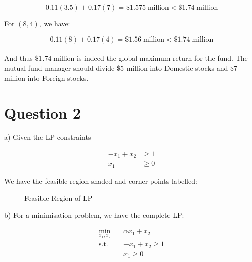\documentclass[12pt]{article}
\begin{document}
\begin{equation*}
    0.11(3.5) + 0.17(7) = \$ 1.575 \; \text{million} < \$ 1.74 \; \text{million}
\end{equation*}

\noindent For $(8, 4)$, we have: 

\begin{equation*}
    0.11(8) + 0.17(4) = \$ 1.56 \; \text{million} < \$ 1.74 \; \text{million}
\end{equation*} \\ 

\noindent And thus $\$ 1.74 \; \text{million}$ is indeed the global maximum return for the fund. The mutual fund manager should divide \$5 million into Domestic stocks and \$7 million into Foreign stocks. 


\newpage 

\section*{Question 2}
a) Given the LP constraints 

\begin{align*}
    -x_{1} + x_{2} & \geq 1 \\ 
    x_{1} & \geq 0
\end{align*}

\noindent We have the feasible region shaded and corner points labelled: 

\begin{figure}[H]
    \centering
    \caption{Feasible Region of LP}
    \label{fig:2-feasiblelp2}
\end{figure} 

\noindent b) For a minimisation problem, we have the complete LP: 

\begin{align*}
    \min_{x_{1}, x_{2}} \quad & \alpha x_{1} + x_{2} \\ 
    \text{s.t.} \quad &-x_{1}+x_{2} \geq 1 \\
    & x_{1} \geq 0
\end{align*}
\end{document}
